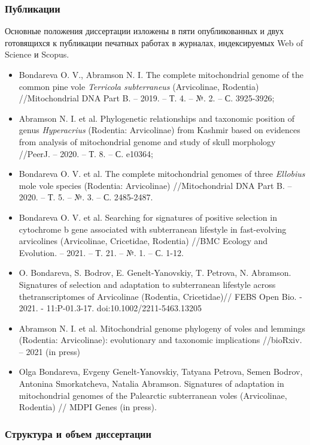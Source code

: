 \subsubsection*{Публикации}
Основные положения диссертации изложены в пяти опубликованных и двух готовящихся к публикации печатных работах в журналах, индексируемых Web of Science и Scopus.
\begin{itemize} 
	\item[\textbullet] Bondareva O. V., Abramson N. I. The complete mitochondrial genome of the common pine vole \textit{Terricola subterraneus} (Arvicolinae, Rodentia) //Mitochondrial DNA Part B. – 2019. – Т. 4. – №. 2. – С. 3925-3926;
	\item[\textbullet] Abramson N. I. et al. Phylogenetic relationships and taxonomic position of genus \textit{Hyperacrius} (Rodentia: Arvicolinae) from Kashmir based on evidences from analysis of mitochondrial genome and study of skull morphology //PeerJ. – 2020. – Т. 8. – С. e10364;
	\item[\textbullet] Bondareva O. V. et al. The complete mitochondrial genomes of three \textit{Ellobius} mole vole species (Rodentia: Arvicolinae) //Mitochondrial DNA Part B. – 2020. – Т. 5. – №. 3. – С. 2485-2487. 
	\item[\textbullet] Bondareva O. V. et al. Searching for signatures of positive selection in cytochrome b gene associated with subterranean lifestyle in fast-evolving arvicolines (Arvicolinae, Cricetidae, Rodentia) //BMC Ecology and Evolution. – 2021. – Т. 21. – №. 1. – С. 1-12.
	\item[\textbullet] O. Bondareva, S. Bodrov, E. Genelt-Yanovskiy, T. Petrova, N. Abramson. Signatures of selection and adaptation to subterranean lifestyle across thetranscriptomes of Arvicolinae (Rodentia, Cricetidae)// FEBS Open Bio. - 2021. - 11:P-01.3-17. doi:10.1002/2211-5463.13205
	\item[\textbullet] Abramson N. I. et al. Mitochondrial genome phylogeny of voles and lemmings (Rodentia: Arvicolinae): evolutionary and taxonomic implications //bioRxiv. – 2021 (in press)
	\item[\textbullet]  Olga Bondareva, Evgeny Genelt-Yanovskiy, Tatyana Petrova, Semen Bodrov, Antonina Smorkatcheva, Natalia Abramson. Signatures of adaptation in mitochondrial genomes of the Palearctic subterranean voles (Arvicolinae, Rodentia) // MDPI Genes (in press).
\end{itemize}


\subsubsection*{Структура и объем диссертации}

